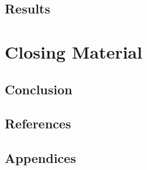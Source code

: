 \documentclass[11pt]{article}
\begin{document}
\subsection{Results}




\section{Closing Material}
\subsection{Conclusion}
\subsection{References}
\subsection{Appendices}
\end{document}
